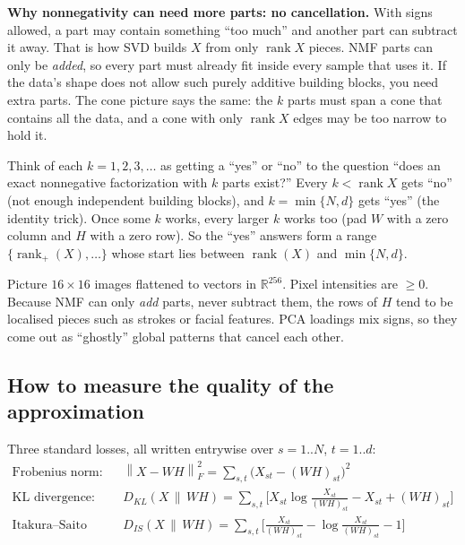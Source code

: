 \documentclass[11pt]{article}
\newcommand{\R}{\mathbb{R}}
\newcommand{\rank}{\operatorname{rank}}
\newcommand{\Fro}[1]{\left\lVert #1\right\rVert_F}
\begin{document}
\begin{intuition}
\textbf{Why nonnegativity can need more parts: no cancellation.} With signs allowed, a part may contain
something ``too much'' and another part can subtract it away. That is how SVD builds $X$ from only
$\rank X$ pieces. NMF parts can only be \emph{added}, so every part must already fit inside every sample that
uses it. If the data's shape does not allow such purely additive building blocks, you need extra parts.
The cone picture says the same: the $k$ parts must span a cone that contains all the data, and a
cone with only $\rank X$ edges may be too narrow to hold it.
\end{intuition}

\begin{intuition}
Think of each $k=1,2,3,\dots$ as getting a ``yes'' or ``no'' to the question ``does an exact nonnegative factorization
with $k$ parts exist?'' Every $k<\rank X$ gets ``no'' (not enough independent building blocks), and
$k=\min\{N,d\}$ gets ``yes'' (the identity trick). Once some $k$ works, every larger $k$ works too (pad
$W$ with a zero column and $H$ with a zero row). So the ``yes'' answers form a range
$\{\operatorname{rank}_+(X),\dots\}$ whose start lies between $\rank(X)$ and $\min\{N,d\}$.
\end{intuition}

\begin{intuition}
Picture $16\times16$ images flattened to vectors in $\R^{256}$. Pixel intensities are
$\ge0$. Because NMF can only \emph{add} parts, never subtract them, the rows of $H$ tend to be
localised pieces such as strokes or facial features. PCA loadings mix signs, so they
come out as ``ghostly'' global patterns that cancel each other.
\end{intuition}

\subsection{How to measure the quality of the approximation}

Three standard losses, all written entrywise over $s=1..N$, $t=1..d$:
\begin{align*}
\text{Frobenius norm:}\quad & \Fro{X-WH}^2=\sum_{s,t}\big(X_{st}-(WH)_{st}\big)^2\\
\text{KL divergence:}\quad & D_{KL}(X\,\|\,WH)=\sum_{s,t}\Big[X_{st}\log\frac{X_{st}}{(WH)_{st}}-X_{st}+(WH)_{st}\Big]\\
\text{Itakura--Saito divergence:}\quad & D_{IS}(X\,\|\,WH)=\sum_{s,t}\Big[\frac{X_{st}}{(WH)_{st}}-\log\frac{X_{st}}{(WH)_{st}}-1\Big]
\end{align*}
\end{document}
